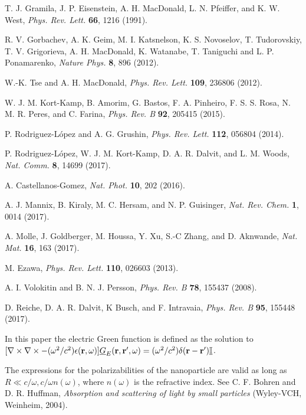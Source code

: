 \documentclass[10pt,aps,prl,superscriptaddress,showpacs,twocolumn]{revtex4-1}
\begin{document}
\begin{thebibliography}{1}
T. J. Gramila, J. P. Eisenstein, A. H. MacDonald, L. N. Pfeiffer, and K. W. West,
\newblock \textit{Phys. Rev. Lett.} {\bf 66}, 1216 (1991).

R. V. Gorbachev, A. K. Geim, M. I. Katsnelson, K. S. Novoselov, T. Tudorovskiy, T. V. Grigorieva, A. H. MacDonald, K. Watanabe, T. Taniguchi and L. P. Ponamarenko,
\newblock \textit{Nature Phys.} {\bf 8}, 896 (2012).

W.-K. Tse and A. H. MacDonald,
{\it Phys. Rev. Lett.} {\bf 109}, 236806 (2012).

W. J. M. Kort-Kamp, B. Amorim, G. Bastos, F. A. Pinheiro, F. S. S. Rosa, N. M. R. Peres, and C. Farina,
{\it Phys. Rev. B} {\bf 92}, 205415 (2015).

P. Rodriguez-L\'opez and A. G. Grushin,
{\it Phys. Rev. Lett.} {\bf 112}, 056804 (2014).

P. Rodriguez-L\'opez, W. J. M. Kort-Kamp, D. A. R. Dalvit, and L. M. Woods,
{\it Nat. Comm.} {\bf 8}, 14699 (2017).

A. Castellanos-Gomez,
{\it Nat. Phot.} {\bf 10}, 202 (2016).

A. J. Mannix, B. Kiraly, M. C. Hersam, and N. P. Guisinger,
{\it Nat. Rev. Chem.} {\bf 1}, 0014 (2017).

A. Molle, J. Goldberger, M. Houssa, Y. Xu, S.-C Zhang, and D. Aknwande,
{\it Nat. Mat.} {\bf 16}, 163 (2017).

M. Ezawa, 
{\it Phys. Rev. Lett.} {\bf 110}, 026603 (2013). 

A. I. Volokitin and B. N. J. Persson,
{\it Phys. Rev. B} {\bf 78}, 155437 (2008).

D. Reiche, D. A. R. Dalvit, K Busch, and F. Intravaia,
{\it Phys. Rev. B} {\bf 95}, 155448 (2017).

In this paper the electric Green function is defined as the solution to 
$[\nabla \times \nabla \times - (\omega^2/c^2) \epsilon({\bf r},\omega)] \underline{G}_E({\bf r}, {\bf r}',\omega) = 
(\omega^2/c^2) \delta({\bf r}-{\bf r}') \underline{\mathbb{I}}$.

The expressions for the polarizabilities of the nanoparticle are valid as long as $R \ll c/\omega, c/\omega n(\omega)$, where $n(\omega)$ is the refractive index. See C. F. Bohren and D. R. Huffman,
{\it Absorption and scattering of light by small particles}
(Wyley-VCH, Weinheim, 2004).


\end{thebibliography}
\end{document}
